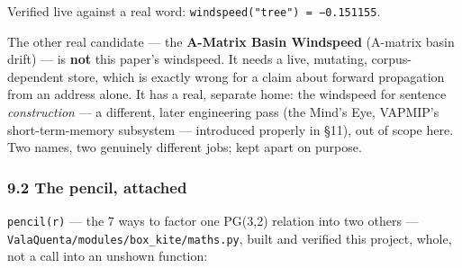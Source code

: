 \documentclass[
  10pt,
]{article}
\begin{document}
Verified live against a real word:
\texttt{windspeed("tree")\ =\ −0.151155}.

The other real candidate --- the \textbf{A-Matrix Basin Windspeed}
(A-matrix basin drift) --- is \textbf{not} this paper's windspeed. It
needs a live, mutating, corpus-dependent store, which is exactly wrong
for a claim about forward propagation from an address alone. It has a
real, separate home: the windspeed for sentence \emph{construction} ---
a different, later engineering pass (the Mind's Eye, VAPMIP's
short-term-memory subsystem --- introduced properly in §11), out of
scope here. Two names, two genuinely different jobs; kept apart on
purpose.

\hypertarget{the-pencil-attached}{%
\subsubsection{9.2 The pencil, attached}\label{the-pencil-attached}}

\texttt{pencil(r)} --- the 7 ways to factor one PG(3,2) relation into
two others --- \texttt{ValaQuenta/modules/box\_kite/maths.py}, built and
verified this project, whole, not a call into an unshown function:
\end{document}
